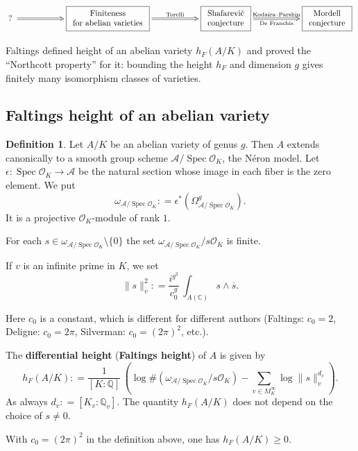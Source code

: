 \documentclass{article}
\theoremstyle{definition}
\newtheorem{definition}[proposition]{Definition}
\DeclareMathOperator{\Spec}{Spec}
\newcommand{\term}{\textbf}
\newcommand{\dfn}{\mathrel{\mathop:}=}
\newcommand{\QQ}{\mathbb{Q}}
\newcommand{\CC}{\mathbb{C}}
\renewcommand{\O}{\mathcal{O}}
\begin{document}
\[ \xymatrix@C=2cm{ ?~ \ar@{=>}[r] & \boxed{\begin{array}{c}\text{Finiteness}\\\text{for abelian varieties}\end{array}} \ar@{=>}[r]^-{\text{Torelli}} & \boxed{\begin{array}{c}\text{Shafarevi\v{c}}\\\text{conjecture}\end{array}}
\ar@{=>}[r]^-{\text{Kodaira--Parshin}}_-{\text{De Franchis}} & \boxed{\begin{array}{c}\text{Mordell}\\\text{conjecture}\end{array}} } \]

Faltings defined height of an abelian variety $h_F (A/K)$ and proved the
``Northcott property'' for it: bounding the height $h_F$ and dimension $g$ gives
finitely many isomorphism classes of varieties.

\subsection*{Faltings height of an abelian variety}

\begin{definition}
  Let $A/K$ be an abelian variety of genus $g$. Then $A$ extends canonically to
  a smooth group scheme $\mathcal{A} / \Spec \O_K$, the N\'eron model. Let
  $\epsilon\colon \Spec \O_K \to \mathcal{A}$ be the natural section whose image
  in each fiber is the zero element. We put
  $$\omega_{\mathcal{A}/\Spec \O_K} \dfn \epsilon^* (\Omega_{\mathcal{A}/\Spec\O_K}^g).$$
  It is a projective $\O_K$-module of rank $1$.

  For each $s\in \omega_{\mathcal{A}/\Spec\O_K} \setminus \{ 0 \}$ the set
  $\omega_{\mathcal{A}/\Spec \O_K} / s \O_K$ is finite.

  If $v$ is an infinite prime in $K$, we set
  $$\|s\|_v^2 \dfn \frac{i^{g^2}}{c_0^g} \, \int_{A (\CC)} s \wedge \overline{s}.$$

  Here $c_0$ is a constant, which is different for different authors (Faltings:
  $c_0 = 2$, Deligne: $c_0 = 2\pi$, Silverman: $c_0 = (2\pi)^2$, etc.).

  The \term{differential height} (\term{Faltings height}) of $A$ is given by
  $$h_F (A/K) \dfn \frac{1}{[K:\QQ]} \, \left(\log \#(\omega_{\mathcal{A}/\Spec\O_K}/s\O_K) - \sum_{v \in M_K^\infty} \log \|s\|_v^{d_v}\right).$$
  As always $d_v \dfn [K_v : \QQ_v]$. The quantity $h_F (A/K)$ does not depend
  on the choice of $s \ne 0$.

  With $c_0 = (2\pi)^2$ in the definition above, one has $h_F (A/K) \ge 0$.
\end{definition}
\end{document}
